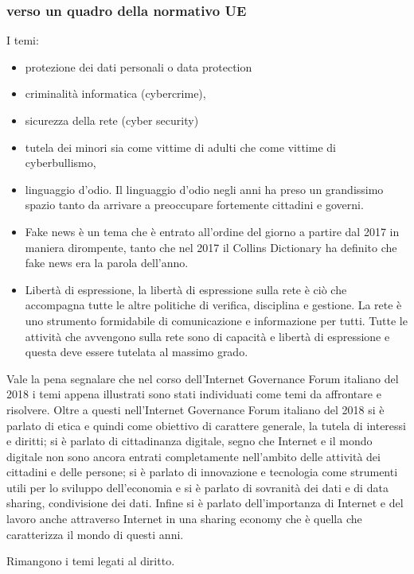 \subsubsection{verso un quadro della normativo UE }
I temi:

\begin{itemize}
    \item protezione dei dati personali o data protection
    \item criminalità informatica (cybercrime),
    \item sicurezza della rete (cyber security)
    \item tutela dei minori sia come vittime di adulti che come vittime di cyberbullismo,
    \item linguaggio d'odio. Il linguaggio d'odio negli anni ha preso un grandissimo spazio tanto da arrivare a preoccupare fortemente cittadini e governi.
    \item Fake news è un tema che è entrato all'ordine del giorno a partire dal 2017 in maniera dirompente, tanto che nel 2017 il Collins Dictionary ha definito che fake news era la parola dell'anno.
    \item Libertà di espressione, la libertà di espressione sulla rete è ciò che accompagna tutte le altre politiche di verifica, disciplina e gestione. La rete è uno strumento formidabile di comunicazione e informazione per tutti. Tutte le attività che avvengono sulla rete sono di capacità e libertà di espressione e questa deve essere tutelata al massimo grado.
\end{itemize}
Vale la pena segnalare che nel corso dell'Internet Governance Forum italiano del 2018 i temi appena illustrati sono stati individuati come temi da affrontare e risolvere. Oltre a questi nell'Internet Governance Forum italiano del 2018 si è parlato di etica e quindi come obiettivo di carattere generale, la tutela di interessi e diritti; si è parlato di cittadinanza digitale, segno che Internet e il mondo digitale non sono ancora entrati completamente nell'ambito delle attività dei cittadini e delle persone; si è parlato di innovazione e tecnologia come strumenti utili per lo sviluppo dell'economia e si è parlato di sovranità dei dati e di data sharing, condivisione dei dati. Infine si è parlato dell'importanza di Internet e del lavoro anche attraverso Internet in una sharing economy che è quella che caratterizza il mondo di questi anni. \par
Rimangono i temi legati al diritto.
